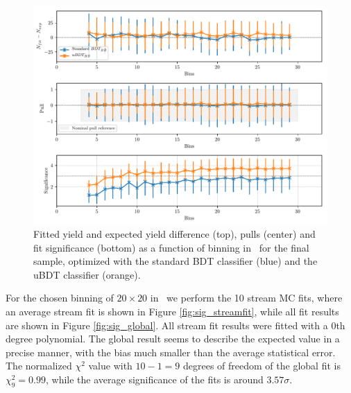 \begin{figure}[!htbp]
	\centering
	\captionsetup{width=0.8\linewidth}
	\includegraphics[width=\linewidth]{fig/sig_binning}
	\caption{Fitted yield and expected yield difference (top), pulls (center) and fit significance (bottom) as a function of binning in \vars~for the final sample, optimized with the standard BDT classifier (blue) and the uBDT classifier (orange).}
	\label{fig:sig_binning}
\end{figure}

For the chosen binning of $20 \times 20$ in \vars~we perform the 10 stream MC fits, where an average stream fit is shown in Figure \ref{fig:sig_streamfit}, while all fit results are shown in Figure \ref{fig:sig_global}. All stream fit results were fitted with a 0th degree polynomial. The global result seems to describe the expected value in a precise manner, with the bias much smaller than the average statistical error. The normalized $\chi^2$ value with $10-1=9$ degrees of freedom of the global fit is $\chi^2_9 = 0.99$, while the average significance of the fits is around $3.57 \sigma$.

